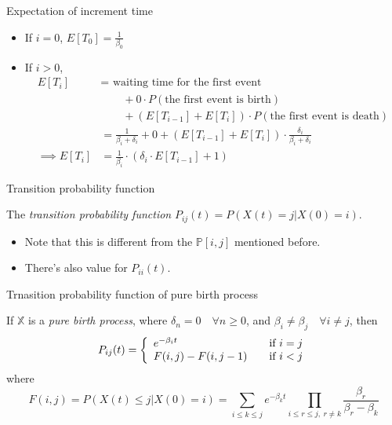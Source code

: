 \documentclass[mathserif]{beamer}
\begin{document}
\begin{frame}{Expectation of increment time}
\begin{itemize}
\item If $i = 0$, $\displaystyle{E[T_0] = \frac{1}{\beta_0}}$
\item If $i > 0$,
\begin{align*}
E[T_i] & = \text{ waiting time for the first event} \\
& \qquad + 0 \cdot P(\text{the first event is birth}) \\
& \qquad + (E[T_{i-1}] + E[T_i])\cdot P(\text{the first event is death}) \\
& = \frac{1}{\beta_i + \delta_i} + 0 + (E[T_{i-1}] + E[T_i])\cdot \frac{\delta_i}{\beta_i + \delta_i} \\
\implies E[T_i] & = \frac{1}{\beta_i}\cdot (\delta_i\cdot E[T_{i-1}] + 1)
\end{align*}
\end{itemize}
\end{frame}

\begin{frame}{Transition probability function}
\begin{definition}
The \emph{transition probability function} $P_{ij}(t) = P(X(t) = j | X(0) = i)$.
\end{definition}
\begin{itemize}
\item Note that this is different from the $\mathbb{P}[i,j]$ mentioned before.
\item There's also value for $P_{ii}(t)$.
\end{itemize}
\end{frame}

\begin{frame}{Trnasition probability function of pure birth process}\label{pure_birth}
\begin{theorem}
If $\mathbb{X}$ is a \emph{pure birth process}, where $\delta_n = 0 \quad\forall n\geq 0$, 
and $\beta_i\neq \beta_j \quad\forall i\neq j$, then
\[
P_{ij}(t) = \left\{
\begin{array}{l l}
e^{-\beta_i t} & \quad\text{if } i = j \\
F(i,j) - F(i,j-1) & \quad\text{if } i < j \\
\end{array}
\right.
\]
where
\[
F(i,j) = P(X(t)\leq j | X(0) = i) = \sum_{i\leq k\leq j} e^{-\beta_k t} 
\prod_{i\leq r\leq j,~ r\neq k}\frac{\beta_r}{\beta_r - \beta_k}
\]
\end{theorem}
\end{frame}
\end{document}
